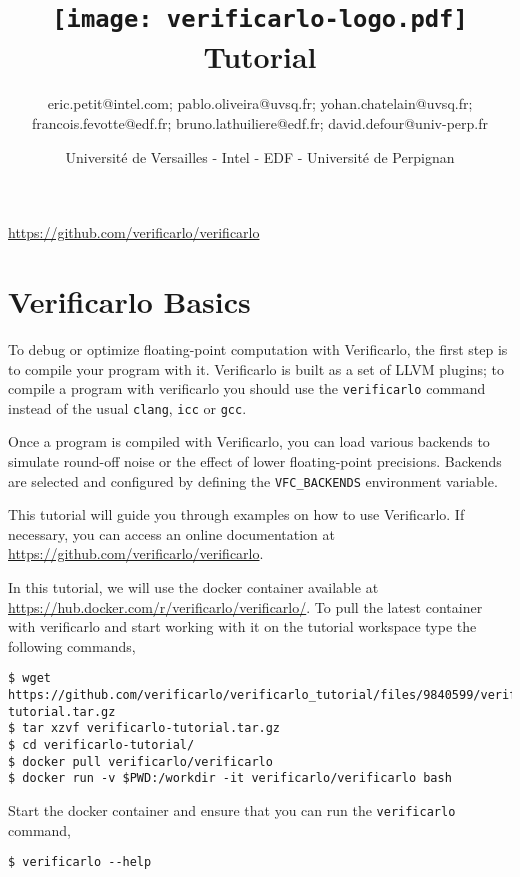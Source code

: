\documentclass{TP}
\title{\texttt{[image: verificarlo-logo.pdf]}\\[4mm]
  Tutorial}
\author{eric.petit@intel.com; pablo.oliveira@uvsq.fr; yohan.chatelain@uvsq.fr;
  francois.fevotte@edf.fr; bruno.lathuiliere@edf.fr; david.defour@univ-perp.fr}
\date{Université de Versailles - Intel - EDF - Université de Perpignan}
\begin{document}
\maketitle

\centerline{\url{https://github.com/verificarlo/verificarlo}}
\tableofcontents


\section{Verificarlo Basics}

To debug or optimize floating-point computation with Verificarlo, the first
step is to compile your program with it. Verificarlo is built as a set of LLVM
plugins; to compile a program with verificarlo you should use the \texttt{verificarlo}
command instead of the usual \texttt{clang}, \texttt{icc} or \texttt{gcc}.

Once a program is compiled with Verificarlo, you can load various backends to
simulate round-off noise or the effect of lower floating-point precisions. Backends are selected and configured by defining the \texttt{VFC\_BACKENDS} environment variable.

This tutorial will guide you through examples on how to use Verificarlo.
If necessary, you can access an online documentation at \url{https://github.com/verificarlo/verificarlo}.

In this tutorial, we will use the docker container available at
\url{https://hub.docker.com/r/verificarlo/verificarlo/}.
To pull the latest container with verificarlo and start working with it on
the tutorial workspace type the following commands,
\begin{verbatim}
$ wget https://github.com/verificarlo/verificarlo_tutorial/files/9840599/verificarlo-tutorial.tar.gz
$ tar xzvf verificarlo-tutorial.tar.gz
$ cd verificarlo-tutorial/
$ docker pull verificarlo/verificarlo
$ docker run -v $PWD:/workdir -it verificarlo/verificarlo bash
\end{verbatim}

\begin{question}
  Start the docker container and ensure that you can run the \texttt{verificarlo} command,
  \begin{verbatim}
$ verificarlo --help
\end{verbatim}
\end{question}



\FloatBarrier


\FloatBarrier


\FloatBarrier



\FloatBarrier
\newpage


\end{document}

